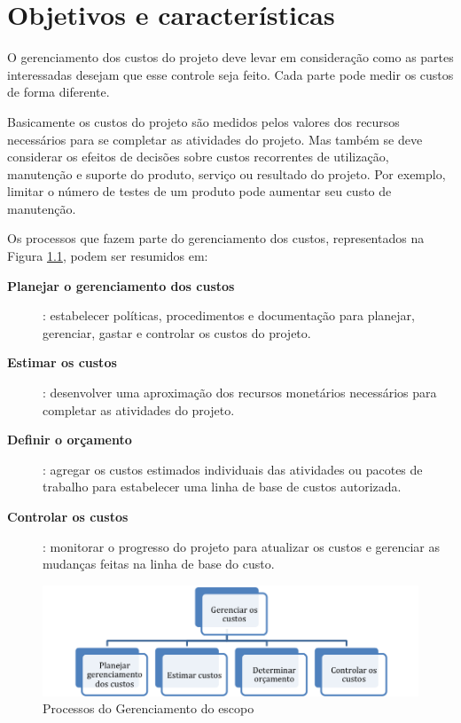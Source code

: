 \chapter{Objetivos e características}

O gerenciamento dos custos do projeto deve levar em consideração como as partes interessadas desejam que esse controle seja feito. Cada parte pode medir os custos de forma diferente.

Basicamente os custos do projeto são medidos pelos valores dos recursos necessários para se completar as atividades do projeto. Mas também se deve considerar os efeitos de decisões sobre custos recorrentes de utilização, manutenção e suporte do produto, serviço ou resultado do projeto. Por exemplo, limitar o número de testes de um produto pode aumentar seu custo de manutenção.

Os processos que fazem parte do gerenciamento dos custos, representados na Figura \ref{fig:proc:ger:custos}, podem ser resumidos em:

\begin{description}
	
	\item[\textbf{Planejar o gerenciamento dos custos}]: estabelecer políticas, procedimentos e documentação para planejar, gerenciar, gastar e controlar os custos do projeto.
	
	\item[\textbf{Estimar os custos}]: desenvolver uma aproximação dos recursos monetários necessários para completar as atividades do projeto.

	\item[\textbf{Definir o orçamento}]: agregar os custos estimados individuais das atividades ou pacotes de trabalho para estabelecer uma linha de base de custos autorizada.
	
	\item[\textbf{Controlar os custos}]: monitorar o progresso do projeto para atualizar os custos e gerenciar as mudanças feitas na linha de base do custo.	

\end{description}

\begin{figure}[!h]
	\centering
	\includegraphics[scale=0.75]{Figuras/gerenciamento_custos.png}
	\caption{Processos do Gerenciamento do escopo}
	\label{fig:proc:ger:custos}
\end{figure}


